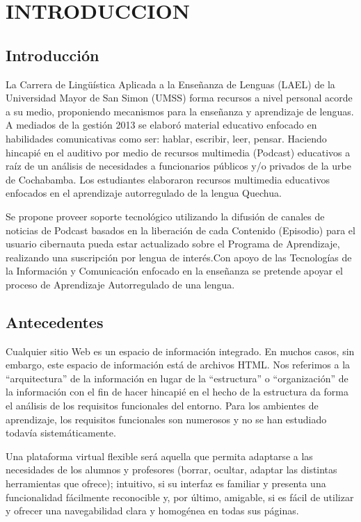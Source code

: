 \chapter{INTRODUCCION}

\section{Introducción}

La Carrera de Lingüística Aplicada a la Enseñanza de Lenguas (LAEL) de la Universidad Mayor de
San Simon (UMSS) forma recursos a nivel personal acorde a su medio, proponiendo mecanismos para
la enseñanza y aprendizaje de lenguas. A mediados de la gestión 2013 se elaboró material 
educativo enfocado en habilidades comunicativas como ser: hablar, escribir, leer, pensar.
Haciendo hincapié en el auditivo por medio de recursos multimedia (Podcast) educativos 
a raíz de un análisis de necesidades a funcionarios públicos y/o privados de la urbe de
Cochabamba. Los estudiantes elaboraron recursos multimedia educativos enfocados en el 
aprendizaje autorregulado de la lengua Quechua.

Se propone proveer soporte tecnológico utilizando la difusión de canales de noticias de
Podcast basados en la liberación de cada Contenido (Episodio) para el usuario 
cibernauta pueda estar actualizado sobre el Programa de Aprendizaje, realizando una 
suscripción por lengua de interés.Con apoyo de las Tecnologías de la Información y
Comunicación enfocado en la enseñanza se pretende apoyar el proceso de Aprendizaje
Autorregulado de una lengua.

\section{Antecedentes}

\scriptsize

Cualquier sitio Web es un espacio de información integrado. En muchos casos, sin embargo, este
espacio de información está de archivos HTML. Nos referimos a la ``arquitectura'' de la información
en lugar de la ``estructura'' o ``organización'' de la información con el fin de hacer hincapié en el
hecho de la estructura da forma el análisis de los requisitos funcionales del entorno. Para los
ambientes de aprendizaje, los requisitos funcionales son numerosos y no se han estudiado todavía
sistemáticamente.

Una plataforma virtual flexible será aquella que permita adaptarse a las necesidades de los alumnos
y profesores (borrar, ocultar, adaptar las distintas herramientas que ofrece); intuitivo, si su 
interfaz es familiar y presenta una funcionalidad fácilmente reconocible y, por último, amigable,
si es fácil de utilizar y ofrecer una navegabilidad clara y homogénea en todas sus páginas.

